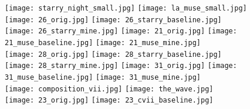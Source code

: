 \documentclass[runningheads]{llncs}
\begin{document}
\begin{figure}
  \texttt{[image: starry\_night\_small.jpg]}
  \hspace{7mm}
  \texttt{[image: la\_muse\_small.jpg]} \\
\texttt{[image: 26\_orig.jpg]}
  \texttt{[image: 26\_starry\_baseline.jpg]}
  \texttt{[image: 26\_starry\_mine.jpg]}
  \texttt{[image: 21\_orig.jpg]}
  \texttt{[image: 21\_muse\_baseline.jpg]}
  \texttt{[image: 21\_muse\_mine.jpg]} \\
  \texttt{[image: 28\_orig.jpg]}
  \texttt{[image: 28\_starry\_baseline.jpg]}
  \texttt{[image: 28\_starry\_mine.jpg]}
  \texttt{[image: 31\_orig.jpg]}
  \texttt{[image: 31\_muse\_baseline.jpg]}
  \texttt{[image: 31\_muse\_mine.jpg]} \\
  \texttt{[image: composition\_vii.jpg]}
  \hspace{1mm}
  \texttt{[image: the\_wave.jpg]} \\
\texttt{[image: 23\_orig.jpg]}
  \texttt{[image: 23\_cvii\_baseline.jpg]}

\end{figure}
\end{document}
